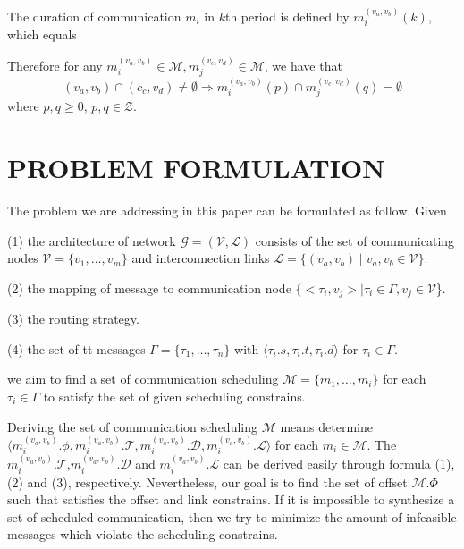 \documentclass[jornal]{IEEEtran}
\begin{document}
The duration of communication $m_{i}$ in $\mathit{k}$th period is defined by ${m_{i}^{(v_{a},v_{b})}}(k)$, which equals
\begin{equation}
	[
	k\times{m_{i}^{(v_{a},v_{b})}}.\mathcal{T}
	,
	k\times{m_{i}^{(v_{a},v_{b})}}.\mathcal{T}+{m_{i}^{(v_{a},v_{b})}}.\phi+{m_{i}^{(v_{a},v_{b})}}.\mathcal{L}			
	]
\end{equation}

Therefore for any $ {m_{i}^{(v_{a},v_{b})}}\in\mathcal{M}, {m_{j}^{(v_{c},v_{d})}}\in\mathcal{M}$, we have that
\begin{equation}
	(v_{a},v_{b})
	\cap
	(c_{c},v_{d})
	\neq
	\emptyset
	\Longrightarrow
	{m_{i}^{(v_{a},v_{b})}}(p)
	\cap
	{m_{j}^{(v_{c},v_{d})}}(q)
	=
	\emptyset	
\end{equation}
where $p,q\geq 0$, $p,q\in\mathcal{Z}$.

\section{PROBLEM FORMULATION\label{s:formulation}}
The problem we are addressing in this paper can be formulated as follow. Given 

(1) the architecture of  network $\mathcal{G}=(\mathcal{V},\mathcal{L})$ consists of the set of communicating nodes $\mathcal{V}=\{\mathit{v}_{1},\dots,\mathit{v}_{m}\}$ and interconnection links $\mathcal{L}=\{ (v_{a},v_{b}) \mid  v_{a},v_{b}\in \mathcal{V}\}$.

(2) the mapping of message to communication node $\{<\tau_{i},v_{j}>\mid \tau_{i}\in\Gamma,v_{j}\in\mathcal{V}$\}. 

(3) the routing strategy.

(4) the set of tt-messages $ \Gamma = \{\tau_{1},\dots,\tau_{n} \}$ with  $\langle \tau_{i}.s, \tau_{i}.t, \tau_{i}.d\rangle$ for $\tau_{i}\in \Gamma$.

we aim to find a set of communication scheduling $\mathcal{M} = \{m_{1},\dots,m_{i}\}$ for each $\tau_{i}\in \Gamma $ to satisfy the set of given scheduling constrains. 

Deriving the set of communication scheduling $\mathcal{M}$ means determine $\langle m_{i}^{(v_{a},v_{b})}.\phi, m_{i}^{(v_{a},v_{b})}.\mathcal{T}, m_{i}^{(v_{a},v_{b})}.\mathcal{D},m_{i}^{(v_{a},v_{b})}.\mathcal{L} \rangle$ for each $m_{i}\in \mathcal{M}$. The $m_{i}^{(v_{a},v_{b})}.\mathcal{T}$,$m_{i}^{(v_{a},v_{b})}.\mathcal{D}$ and $m_{i}^{(v_{a},v_{b})}.\mathcal{L}$ can be derived easily through formula (1),(2) and (3), respectively. Nevertheless, our goal is to find the set of offset $\mathcal{M}.\Phi$ such that satisfies the offset and link constrains. If it is impossible to synthesize a set of scheduled communication, then we try to minimize the amount of infeasible messages which violate the scheduling constrains.
\end{document}
